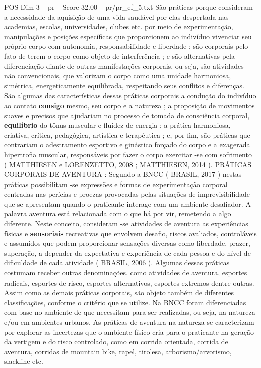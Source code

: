 \begin{textsample}{POS Dim 3 – pr – Score 32.00 – pr/pr\_ef\_5.txt}
São práticas porque consideram a necessidade da aquisição de uma vida saudável por elas despertada nas academias, escolas, universidades, clubes etc. por meio de experimentação, manipulações e posições específicas que proporcionem ao indivíduo vivenciar seu próprio corpo com autonomia, responsabilidade e liberdade ; são corporais pelo fato de terem o corpo como objeto de interferência ; e são alternativas pela diferenciação diante de outras manifestações corporais, ou seja, são atividades não convencionais, que valorizam o corpo como uma unidade harmoniosa, simétrica, energeticamente equilibrada, respeitando seus conflitos e diferenças.
São algumas das características dessas práticas corporais a condução do indivíduo ao contato \textbf{consigo} mesmo, seu corpo e a natureza ; a proposição de movimentos suaves e precisos que ajudariam no processo de tomada de consciência corporal, \textbf{equilíbrio} do tônus muscular e fluidez de energia ; a prática harmoniosa, criativa, crítica, pedagógica, artística e terapêutica ; e, por fim, são práticas que contrariam o adestramento esportivo e ginástico forçado do corpo e a exagerada hipertrofia muscular, responsáveis por fazer o corpo exercitar -se com sofrimento ( MATTHIESEN e LORENZETTO, 2008 ; MATTHIESEN, 2014 ).
PRÁTICAS CORPORAIS DE AVENTURA : Segundo a BNCC ( BRASIL, 2017 ) nestas práticas possibilitam -se expressões e formas de experimentação corporal centradas nas perícias e proezas provocadas pelas situações de imprevisibilidade que se apresentam quando o praticante interage com um ambiente desafiador.
A palavra aventura está relacionada com o que há por vir, remetendo a algo diferente.
Neste conceito, consideram -se atividades de aventura as experiências físicas e \textbf{sensoriais} recreativas que envolvem desafio, riscos avaliados, controláveis e assumidos que podem proporcionar sensações diversas como liberdade, prazer, superação, a depender da expectativa e experiência de cada pessoa e do nível de dificuldade de cada atividade ( BRASIL, 2006 ).
Algumas dessas práticas costumam receber outras denominações, como atividades de aventura, esportes radicais, esportes de risco, esportes alternativos, esportes extremos dentre outras.
Assim como as demais práticas corporais, são objeto também de diferentes classificações, conforme o critério que se utilize.
Na BNCC foram diferenciadas com base no ambiente de que necessitam para ser realizadas, ou seja, na natureza e/ou em ambientes urbanos.
As práticas de aventura na natureza se caracterizam por explorar as incertezas que o ambiente físico cria para o praticante na geração da vertigem e do risco controlado, como em corrida orientada, corrida de aventura, corridas de mountain bike, rapel, tirolesa, arborismo/arvorismo, slackline etc.

\end{textsample}
